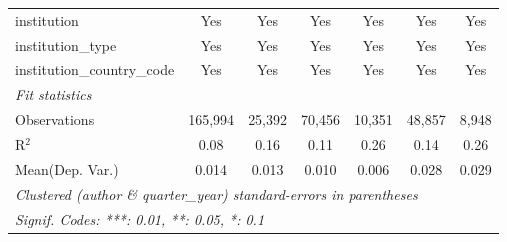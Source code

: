 \begin{tabular}{lcccccc}
   institution                  & Yes           & Yes          & Yes          & Yes         & Yes           & Yes\\  
   institution\_type            & Yes           & Yes          & Yes          & Yes         & Yes           & Yes\\  
   institution\_country\_code   & Yes           & Yes          & Yes          & Yes         & Yes           & Yes\\  
   \midrule
   \emph{Fit statistics}\\
   Observations                 & 165,994       & 25,392       & 70,456       & 10,351      & 48,857        & 8,948\\  
   R$^2$                        & 0.08          & 0.16         & 0.11         & 0.26        & 0.14          & 0.26\\  
Mean(Dep. Var.) & 0.014 & 0.013 & 0.010 & 0.006 & 0.028 & 0.029 \\
   \midrule \midrule
   \multicolumn{7}{l}{\emph{Clustered (author \& quarter\_year) standard-errors in parentheses}}\\
   \multicolumn{7}{l}{\emph{Signif. Codes: ***: 0.01, **: 0.05, *: 0.1}}\\
\end{tabular}
\par\endgroup
